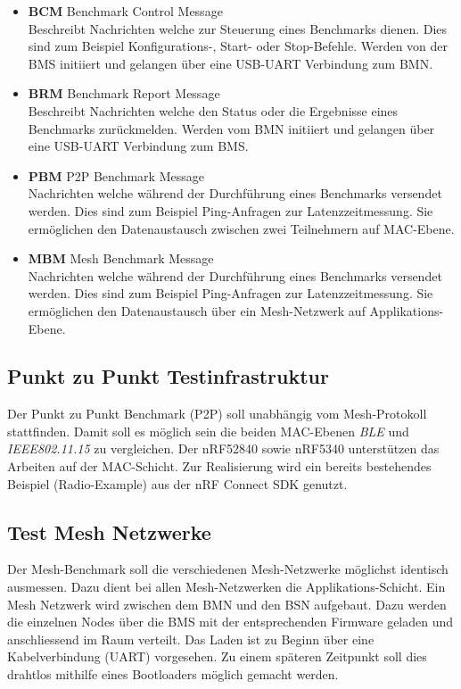 \begin{itemize}
	\item \textbf{BCM} Benchmark Control Message \\ 
	Beschreibt Nachrichten welche zur Steuerung eines Benchmarks dienen. Dies sind zum Beispiel Konfigurations-, Start- oder Stop-Befehle. Werden von der BMS initiiert und gelangen über eine USB-UART Verbindung zum BMN. 
	\item \textbf{BRM} Benchmark Report Message \\ 
	Beschreibt Nachrichten welche den Status oder die Ergebnisse eines Benchmarks zurückmelden. Werden vom BMN initiiert und gelangen über eine USB-UART Verbindung zum BMS.
	\item \textbf{PBM} P2P Benchmark Message \\ 
	Nachrichten welche während der Durchführung eines Benchmarks versendet werden. Dies sind zum Beispiel Ping-Anfragen zur Latenzzeitmessung. Sie ermöglichen den Datenaustausch zwischen zwei Teilnehmern auf MAC-Ebene. 
	\item \textbf{MBM} Mesh Benchmark Message \\ 
	Nachrichten welche während der Durchführung eines Benchmarks versendet werden. Dies sind zum Beispiel Ping-Anfragen zur Latenzzeitmessung. Sie ermöglichen den Datenaustausch über ein Mesh-Netzwerk auf Applikations-Ebene. 
\end{itemize}

\subsection{Punkt zu Punkt Testinfrastruktur}\label{subsec:PunktzuPunktTestinfrastruktur}

Der Punkt zu Punkt Benchmark (P2P) soll unabhängig vom Mesh-Protokoll stattfinden. Damit soll es möglich sein die beiden MAC-Ebenen \textit{BLE} und \textit{IEEE802.11.15} zu vergleichen. Der nRF52840 sowie nRF5340 unterstützen das Arbeiten auf der MAC-Schicht. Zur Realisierung wird ein bereits bestehendes Beispiel (Radio-Example) aus der nRF Connect SDK genutzt.


\subsection{Test Mesh Netzwerke}\label{subsec:TestMeshNetzwerke}

Der Mesh-Benchmark soll die verschiedenen Mesh-Netzwerke möglichst identisch ausmessen. Dazu dient bei allen Mesh-Netzwerken die Applikations-Schicht. Ein Mesh Netzwerk wird zwischen dem BMN und den BSN aufgebaut. Dazu werden die einzelnen Nodes über die BMS mit der entsprechenden Firmware geladen und anschliessend im Raum verteilt. Das Laden ist zu Beginn über eine Kabelverbindung (UART) vorgesehen. Zu einem späteren Zeitpunkt soll dies drahtlos mithilfe eines Bootloaders möglich gemacht werden. 


